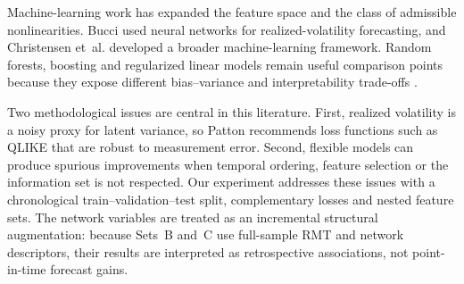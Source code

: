 Machine-learning work has expanded the feature space and the class of admissible nonlinearities. Bucci \cite{bucci_2020_realized} used neural networks for realized-volatility forecasting, and Christensen et~al. \cite{christensen_2022_realized} developed a broader machine-learning framework. Random forests, boosting and regularized linear models remain useful comparison points because they expose different bias--variance and interpretability trade-offs \cite{breiman_2001_random,friedman_2001_greedy,hoerl_kennard_1970_ridge}.

Two methodological issues are central in this literature. First, realized volatility is a noisy proxy for latent variance, so Patton \cite{patton_2011_volatility} recommends loss functions such as QLIKE that are robust to measurement error. Second, flexible models can produce spurious improvements when temporal ordering, feature selection or the information set is not respected. Our experiment addresses these issues with a chronological train--validation--test split, complementary losses and nested feature sets. The network variables are treated as an incremental structural augmentation: because Sets~B and~C use full-sample RMT and network descriptors, their results are interpreted as retrospective associations, not point-in-time forecast gains.
